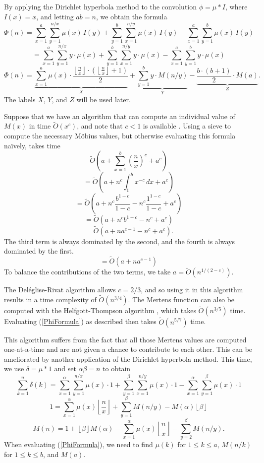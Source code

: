 \documentclass[12pt]{article}
\newcommand{\eqn}[1]{\begin{displaymath} #1 \end{displaymath}}
\newcommand{\neqn}[1]{\begin{equation} #1 \end{equation}}
\newcommand{\floor}[1]{{\left\lfloor #1 \right\rfloor}}
\newcommand{\integral}[4]{\displaystyle\int_{#3}^{#4} \! #1 \, d#2}
\newcommand{\floordiv}[2]{\floor{\frac{#1}{#2}}}
\newcommand{\softO}[0]{\widetilde{O}}
\begin{document}
By applying the Dirichlet hyperbola method to the convolution $\phi = \mu * I$, where $I(x)=x$, and letting $ab=n$, we obtain the formula
\eqn{\Phi(n) = \sum_{x=1}^{a}\sum_{y=1}^{n/x} \mu(x) \, I(y) + \sum_{y=1}^{b}\sum_{x=1}^{n/y} \mu(x) \, I(y) - \sum_{x=1}^{a}\sum_{y=1}^{b} \mu(x) \, I(y)}
\eqn{ = \sum_{x=1}^{a}\sum_{y=1}^{n/x} y \cdot \mu(x) + \sum_{y=1}^{b}\sum_{x=1}^{n/y} y \cdot \mu(x) - \sum_{x=1}^{a}\sum_{y=1}^{b} y \cdot \mu(x)}
\neqn{\Phi(n) = \underbrace{\sum_{x=1}^{a} \mu(x) \cdot \frac{\floordiv{n}{x} \cdot \left(\floordiv{n}{x} + 1\right)}{2}}_{X} + \underbrace{\sum_{y=1}^{b} y \cdot M(n/y)}_{Y} - \underbrace{\frac{b \cdot (b+1)}{2} \cdot M(a)}_{Z}. \label{PhiFormula}}
The labels $X$, $Y$, and $Z$ will be used later.

Suppose that we have an algorithm that can compute an individual value of $M(x)$ in time $\softO(x^c)$, and note that $c < 1$ is available \cite{DR1996}.  Using a sieve to compute the necessary M\"obius values, but otherwise evaluating this formula na\"{i}vely, takes time
\eqn{\softO\left( a + \sum_{x=1}^b \left(\frac{n}{x}\right)^c + a^c \right)}
\eqn{=\softO\left( a + n^c \integral{x^{-c}}{x}{1}{b} + a^c \right)}
\eqn{=\softO\left( a + n^c\frac{b^{1-c}}{1-c} - n^c\frac{1^{1-c}}{1-c} + a^c \right)}
\eqn{=\softO\left( a + n^c b^{1-c} - n^c + a^c \right)}
\eqn{=\softO\left( a + n a^{c-1} - n^c + a^c \right).}
The third term is always dominated by the second, and the fourth is always dominated by the first.
\eqn{=\softO\left( a + n a^{c-1} \right)}
To balance the contributions of the two terms, we take $a = \softO(n^{1/(2-c)})$.

The Del\'{e}glise-Rivat algorithm \cite{DR1996} allows $c=2/3$, and so using it in this algorithm results in a time complexity of $\softO(n^{3/4})$.  The Mertens function can also be computed with the Helfgott-Thompson algorithm \cite{HT23}, which takes $\softO(n^{3/5})$ time.  Evaluating (\ref{PhiFormula}) as described then takes $\softO(n^{5/7})$ time.

This algorithm suffers from the fact that all those Mertens values are computed one-at-a-time and are not given a chance to contribute to each other.  This can be ameliorated by another application of the Dirichlet hyperbola method.  This time, we use $\delta = \mu * 1$ and set $\alpha\beta=n$ to obtain
\eqn{\sum_{k=1}^n \delta(k) = \sum_{x=1}^{\alpha}\sum_{y=1}^{n/x} \mu(x) \cdot 1 + \sum_{y=1}^{\beta}\sum_{x=1}^{n/y} \mu(x) \cdot 1 - \sum_{x=1}^{\alpha}\sum_{y=1}^{\beta} \mu(x) \cdot 1}
\eqn{1 = \sum_{x=1}^{\alpha} \mu(x) \floordiv{n}{x} + \sum_{y=1}^{\beta} M(n/y) - M(\alpha) \floor{\beta}}
\neqn{M(n) = 1 + \floor{\beta} M(\alpha) - \sum_{x=1}^{\alpha} \mu(x) \floordiv{n}{x} - \sum_{y=2}^{\beta} M(n/y). \label{MertensRecursion}}
When evaluating (\ref{PhiFormula}), we need to find $\mu(k)$ for $1 \leq k \leq a$, $M(n/k)$ for $1 \leq k \leq b$, and $M(a)$.
\end{document}
